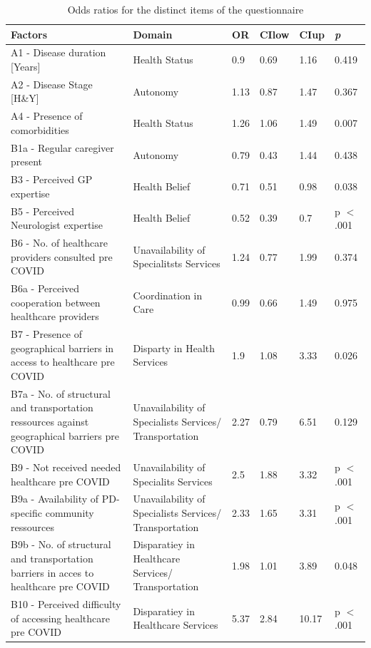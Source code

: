 \documentclass[a4paper,oneside,11pt,english]{scrartcl}
\begin{document}
\newpage
\begin{longtable}[ht!]{|p{5.5cm} | p{3.5cm} | p{1cm} | l | l | p{1.5cm} |}
	\caption{Odds ratios for the distinct items of the questionnaire} 
	\label{tab4:resultsall1} \\ \hline
	\textbf{Factors} & \textbf{Domain} & \textbf{OR} & \textbf{CIlow} & \textbf{CIup} & \textbf{\textit{p}} \\ \hline
	\endhead
	A1 - Disease duration [Years] & Health Status & 0.9 & 0.69 & 1.16 & 0.419 \\ \hline
	A2 - Disease Stage [H\&Y] & Autonomy & 1.13 & 0.87 & 1.47 & 0.367 \\ \hline
	A4 - Presence of comorbidities & Health Status & 1.26 & 1.06 & 1.49 & 0.007 \\ \hline
	B1a - Regular caregiver present & Autonomy & 0.79 & 0.43 & 1.44 & 0.438 \\ \hline
	B3 - Perceived GP expertise & Health Belief & 0.71 & 0.51 & 0.98 & 0.038 \\ \hline
	B5 - Perceived Neurologist expertise & Health Belief & 0.52 & 0.39 & 0.7 & p $<$ .001 \\ \hline
	B6 - No. of healthcare providers consulted pre \textsc{COVID} & Unavailability of Specialitsts Services & 1.24 & 0.77 & 1.99 & 0.374 \\ \hline
	B6a - Perceived cooperation between healthcare providers & Coordination in Care & 0.99 & 0.66 & 1.49 & 0.975 \\ \hline
	B7 - Presence of geographical barriers in access to healthcare pre \textsc{COVID} & Disparty in Health Services & 1.9 & 1.08 & 3.33 & 0.026 \\ \hline
	B7a - No. of structural and transportation ressources against geographical barriers pre \textsc{COVID} & Unavailability of Specialists Services/ Transportation & 2.27 & 0.79 & 6.51 & 0.129 \\ \hline
	B9 - Not received needed healthcare pre \textsc{COVID} & Unavailability of Specialits Services & 2.5 & 1.88 & 3.32 & p $<$ .001 \\ \hline
	B9a - Availability of \textsc{PD}-specific community ressources & Unavailability of Specialists Services/ Transportation & 2.33 & 1.65 & 3.31 & p $<$ .001 \\ \hline
	B9b - No. of structural and transportation barriers in acces to healthcare pre \textsc{COVID} & Disparatiey in Healthcare Services/ Transportation & 1.98 & 1.01 & 3.89 & 0.048 \\ \hline
	B10 - Perceived difficulty of accessing healthcare pre \textsc{COVID} & Disparatiey in Healthcare Services & 5.37 & 2.84 & 10.17 & p $<$ .001 \\ \hline

\end{longtable}
\end{document}

